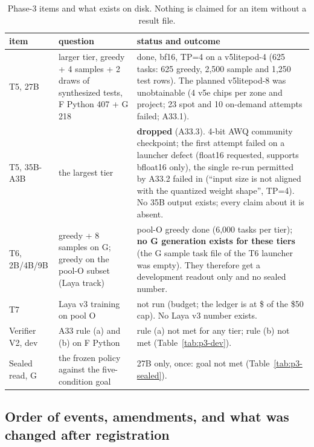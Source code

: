 \documentclass[11pt,a4paper]{article}
\newcommand{\code}[1]{\texttt{\detokenize{#1}}}
\begin{document}
\begin{table}[!htbp]\centering\scriptsize\setlength{\tabcolsep}{3pt}
\caption{Phase-3 items and what exists on disk. Nothing is claimed for an item without a result file.}\label{tab:p3-status}
\begin{tabular}{l p{3.4cm} p{9.2cm}}\toprule
item & question & status and outcome\\\midrule
T5, 27B & larger tier, greedy + 4 samples + 2 draws of synthesized tests, F Python 407 + G 218 & done, bf16, TP=4 on a v5litepod-4 (625 tasks: 625 greedy, 2{,}500 sample and 1{,}250 test rows). The planned v5litepod-8 was unobtainable (4 v5e chips per zone and project; 23 spot and 10 on-demand attempts failed; A33.1).\\
T5, 35B-A3B & the largest tier & \textbf{dropped} (A33.3). 4-bit AWQ community checkpoint; the first attempt failed on a launcher defect (float16 requested, \code{auto\_awq} supports bfloat16 only), the single re-run permitted by A33.2 failed in \code{auto\_awq.create\_weights} (``input size is not aligned with the quantized weight shape'', TP=4). No 35B output exists; every claim about it is absent.\\
T6, 2B/4B/9B & greedy + 8 samples on G; greedy on the pool-O subset (Laya track) & pool-O greedy done (6{,}000 tasks per tier); \textbf{no G generation exists for these tiers} (the G sample task file of the T6 launcher was empty). They therefore get a development readout only and no sealed number.\\
T7 & Laya v3 training on pool O & not run (budget; the ledger is at \$\PThreeTotal{} of the \$50 cap). No Laya v3 number exists.\\
Verifier V2, dev & A33 rule (a) and (b) on F Python & rule (a) not met for any tier; rule (b) not met (Table~\ref{tab:p3-dev}).\\
Sealed read, G & the frozen policy against the five-condition goal & 27B only, once: goal not met (Table~\ref{tab:p3-sealed}).\\
\bottomrule\end{tabular}\end{table}

\subsection{Order of events, amendments, and what was changed after registration}\label{sec:p3-order}
\end{document}
